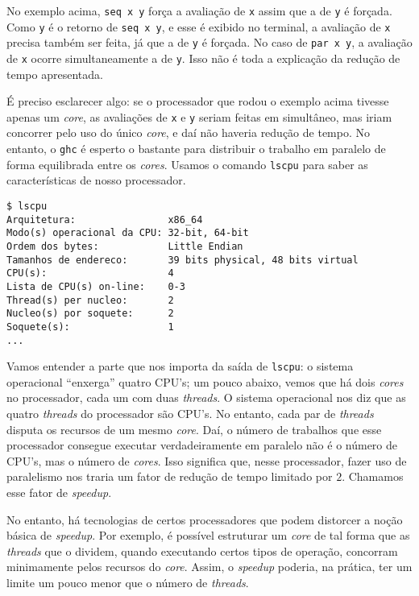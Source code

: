 \documentclass[a4paper]{article}
\begin{document}
No exemplo acima, \texttt{seq x y} força a avaliação de \texttt{x} assim que a de \texttt{y} é forçada.
Como \texttt{y} é o retorno de \mbox{\texttt{seq x y}}, e esse é exibido no terminal, a avaliação de \texttt{x} precisa também ser feita, já que a de \texttt{y} é forçada.
No caso de \texttt{par x y}, a avaliação de \texttt{x} ocorre simultaneamente a de \texttt{y}.
Isso não é toda a explicação da redução de tempo apresentada.

É preciso esclarecer algo: se o processador que rodou o exemplo acima tivesse apenas um \emph{core}, as avaliações de \texttt{x} e \texttt{y} seriam feitas em simultâneo, mas iriam concorrer pelo uso do único \emph{core}, e daí não haveria redução de tempo.
No entanto, o \texttt{ghc} é esperto o bastante para distribuir o trabalho em paralelo de forma equilibrada entre os \emph{cores}.
Usamos o comando \texttt{lscpu} para saber as características de nosso processador.

\begin{verbatim}
$ lscpu
Arquitetura:                x86_64
Modo(s) operacional da CPU: 32-bit, 64-bit
Ordem dos bytes:            Little Endian
Tamanhos de endereco:       39 bits physical, 48 bits virtual
CPU(s):                     4
Lista de CPU(s) on-line:    0-3
Thread(s) per nucleo:       2
Nucleo(s) por soquete:      2
Soquete(s):                 1
...
\end{verbatim}

Vamos entender a parte que nos importa da saída de \texttt{lscpu}:
o sistema operacional ``enxerga'' quatro CPU's;
um pouco abaixo, vemos que há dois \emph{cores} no processador, cada um com duas \emph{threads}.
O sistema operacional nos diz que as quatro \emph{threads} do processador são CPU's.
No entanto, cada par de \emph{threads} disputa os recursos de um mesmo \emph{core}.
Daí, o número de trabalhos que esse processador consegue executar verdadeiramente em paralelo não é o número de CPU's, mas o número de \emph{cores}.
Isso significa que, nesse processador, fazer uso de paralelismo nos traria um fator de redução de tempo limitado por $2$.
Chamamos esse fator de \emph{speedup}.

No entanto, há tecnologias de certos processadores que podem distorcer a noção básica de \emph{speedup}.
Por exemplo, é possível estruturar um \emph{core} de tal forma que as \emph{threads} que o dividem, quando executando certos tipos de operação, concorram minimamente pelos recursos do \emph{core}.
Assim, o \emph{speedup} poderia, na prática, ter um limite um pouco menor que o número de \emph{threads}.
\end{document}
